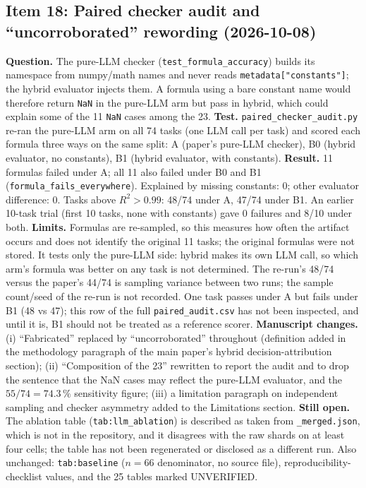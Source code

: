 \documentclass[11pt]{article}
\newcommand{\Rsq}{R^{2}}
\begin{document}
\subsection*{Item 18: Paired checker audit and ``uncorroborated'' rewording (2026-10-08)}
\textbf{Question.} The pure-LLM checker (\texttt{test\_formula\_accuracy}) builds its namespace from numpy/math names and never reads
\texttt{metadata["constants"]}; the hybrid evaluator injects them. A formula using a bare constant name would therefore return
\texttt{NaN} in the pure-LLM arm but pass in hybrid, which could explain some of the 11 \texttt{NaN} cases among the 23.
\textbf{Test.} \texttt{paired\_checker\_audit.py} re-ran the pure-LLM arm on all 74 tasks (one LLM call per task) and scored each formula
three ways on the same split: A (paper's pure-LLM checker), B0 (hybrid evaluator, no constants), B1 (hybrid evaluator, with constants).
\textbf{Result.} 11 formulas failed under A; all 11 also failed under B0 and B1 (\texttt{formula\_fails\_everywhere}). Explained by missing
constants: 0; other evaluator difference: 0. Tasks above $\Rsq>0.99$: 48/74 under A, 47/74 under B1. An earlier 10-task trial (first 10 tasks, none with constants) gave 0 failures and 8/10 under both.
\textbf{Limits.} Formulas are re-sampled, so this measures how often the artifact occurs and does not identify the original 11 tasks;
the original formulas were not stored. It tests only the pure-LLM side: hybrid makes its own LLM call, so which arm's formula was better on any task is not determined.
The re-run's 48/74 versus the paper's 44/74 is sampling variance between two runs; the sample count/seed of the re-run is not recorded.
One task passes under A but fails under B1 (48 vs 47); this row of the full \texttt{paired\_audit.csv} has not been inspected, and until it is,
B1 should not be treated as a reference scorer.
\textbf{Manuscript changes.} (i) ``Fabricated'' replaced by ``uncorroborated'' throughout (definition added in the methodology paragraph of the main paper's hybrid decision-attribution section);
(ii) ``Composition of the 23'' rewritten to report the audit and to drop the sentence that the NaN cases may reflect the pure-LLM evaluator, and the $55/74=74.3\,\%$ sensitivity figure;
(iii) a limitation paragraph on independent sampling and checker asymmetry added to the Limitations section.
\textbf{Still open.} The ablation table (\texttt{tab:llm\_ablation}) is described as taken from \texttt{\_merged.json}, which is not in the repository, and it disagrees with the raw shards on at least four cells; the table has not been regenerated or disclosed as a different run.
Also unchanged: \texttt{tab:baseline} ($n{=}66$ denominator, no source file), reproducibility-checklist values, and the 25 tables marked UNVERIFIED.
\end{document}
